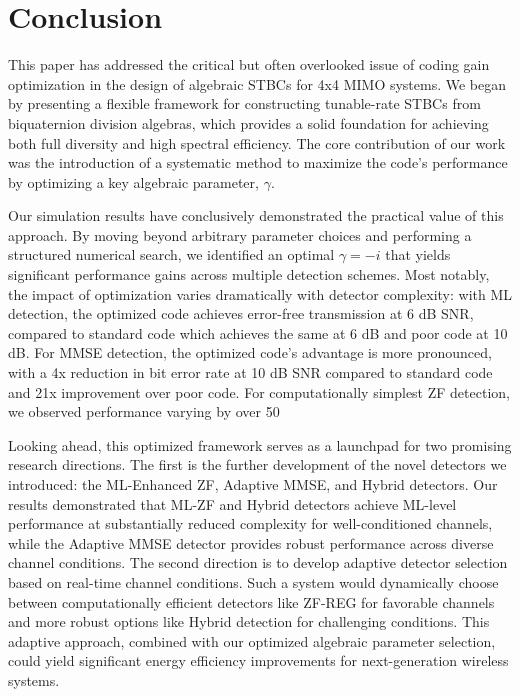 \section{Conclusion}
This paper has addressed the critical but often overlooked issue of coding gain optimization in the design of algebraic STBCs for 4x4 MIMO systems. We began by presenting a flexible framework for constructing tunable-rate STBCs from biquaternion division algebras, which provides a solid foundation for achieving both full diversity and high spectral efficiency. The core contribution of our work was the introduction of a systematic method to maximize the code's performance by optimizing a key algebraic parameter, \(\gamma\).

Our simulation results have conclusively demonstrated the practical value of this approach. By moving beyond arbitrary parameter choices and performing a structured numerical search, we identified an optimal \(\gamma = -i\) that yields significant performance gains across multiple detection schemes. Most notably, the impact of optimization varies dramatically with detector complexity: with ML detection, the optimized code achieves error-free transmission at 6 dB SNR, compared to standard code which achieves the same at 6 dB and poor code at 10 dB. For MMSE detection, the optimized code's advantage is more pronounced, with a 4x reduction in bit error rate at 10 dB SNR compared to standard code and 21x improvement over poor code. For computationally simplest ZF detection, we observed performance varying by over 50%

Looking ahead, this optimized framework serves as a launchpad for two promising research directions. The first is the further development of the novel detectors we introduced: the ML-Enhanced ZF, Adaptive MMSE, and Hybrid detectors. Our results demonstrated that ML-ZF and Hybrid detectors achieve ML-level performance at substantially reduced complexity for well-conditioned channels, while the Adaptive MMSE detector provides robust performance across diverse channel conditions. The second direction is to develop adaptive detector selection based on real-time channel conditions. Such a system would dynamically choose between computationally efficient detectors like ZF-REG for favorable channels and more robust options like Hybrid detection for challenging conditions. This adaptive approach, combined with our optimized algebraic parameter selection, could yield significant energy efficiency improvements for next-generation wireless systems.
